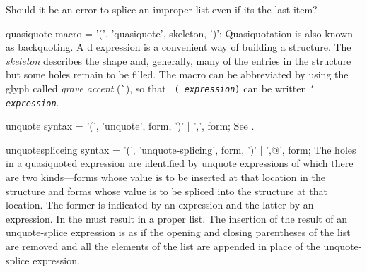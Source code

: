 \gdef\module{syntax-0}
\label{backquote}
%
\begin{optPrivate}
    Should it be an error to splice an improper list even if its the last item?
\end{optPrivate}
%
\begin{optDefinition}

%
\Syntax
\savesyntax\quasiquoteSyntax\vbox{\syntax
quasiquote macro
   = '(', 'quasiquote', skeleton, ')';
\endsyntax}
%
\remarks%
Quasiquotation is also known as backquoting.  A d
expression is a convenient way of building a structure.  The {\em skeleton}
describes the shape and, generally, many of the entries in the structure but
some holes remain to be filled.  The  macro can be
abbreviated by using the glyph called {\em grave accent}
(\verb+`+), so that {\tt
    ( {\em expression})} can be written {\tt `{\em
        expression}}.

%
\Syntax
\savesyntax\unquoteSyntax\vbox{\syntax
unquote syntax
   = '(', 'unquote', form, ')'
   | ',', form;
\endsyntax}
%
\remarks%
See .

%
\Syntax
\savesyntax\unquotespliceSyntax\vbox{\syntax
unquotespliceing syntax
   = '(', 'unquote-splicing', form, ')'
   | ',@', form;
\endsyntax}
%
\remarks%
The holes in a quasiquoted expression are identified by unquote expressions of
which there are two kinds---forms whose value is to be inserted at that location
in the structure and forms whose value is to be spliced into the structure at
that location.  The former is indicated by an  expression and
the latter by an  expression.  In
 the \form{} must result in a proper list.  The
insertion of the result of an unquote-splice expression is as if the opening and
closing parentheses of the list are removed and all the elements of the list are
appended in place of the unquote-splice expression.


\end{optDefinition}
